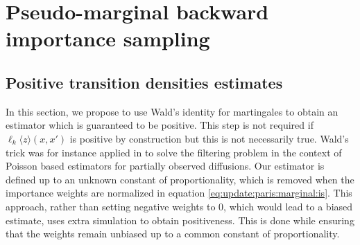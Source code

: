 \documentclass{article}
\newcommand{\kernelmarg}{\mathbf{R}}
\newcommand{\hatqg}[1]{\mathsf{\ell}_{#1}}
\begin{document}
\section{Pseudo-marginal backward importance sampling}
\label{sec:backwardis}


\subsection{Positive transition densities estimates}
In this section, we propose to use Wald’s identity for martingales to obtain an  estimator which is guaranteed to be positive.  This step is not required if $\hatqg{k}\langle z\rangle(x,x')$ is positive by construction but this is not necessarily true.
 Wald's trick was for instance applied in \cite{fearnhead2010random} to solve the filtering problem in the context of Poisson based estimators for partially observed diffusions. Our estimator is defined up to an unknown constant of proportionality, which is removed when the importance weights are normalized in equation \eqref{eq:update:paris:marginal:is}. 
This approach, rather than setting negative weights to 0, which would lead to a biased estimate, uses extra simulation to obtain positiveness. 
This is done while ensuring that the weights remain unbiased up to a common constant of proportionality.%
\end{document}
